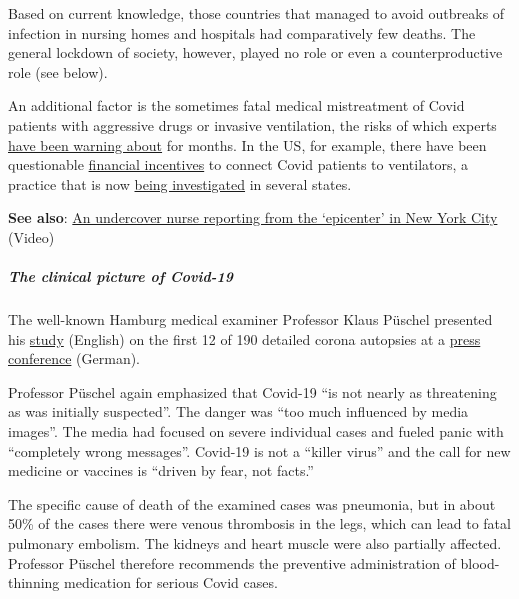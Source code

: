 Based on current knowledge, those countries that managed to avoid
outbreaks of infection in nursing homes and hospitals had comparatively
few deaths. The general lockdown of society, however, played no role or
even a counterproductive role (see below).

An additional factor is the sometimes fatal medical mistreatment of
Covid patients with aggressive drugs or invasive ventilation, the risks
of which experts
\href{https://off-guardian.org/2020/05/06/covid19-are-ventilators-killing-people/}{have
been warning about} for months. In the US, for example, there have been
questionable
\href{https://eu.usatoday.com/story/news/factcheck/2020/04/24/fact-check-medicare-hospitals-paid-more-covid-19-patients-coronavirus/3000638001/}{financial
incentives} to connect Covid patients to ventilators, a practice that is
now
\href{https://nypost.com/2020/05/29/northwell-health-probing-use-of-ventilators-for-covid-patients/}{being
investigated} in several states.

\textbf{See also}: \href{https://www.youtube.com/watch?v=UIDsKdeFOmQ}{An
undercover nurse reporting from the `epicenter' in New York City}
(Video)

\hypertarget{the-clinical-picture-of-covid-19-1}{%
\subparagraph{\texorpdfstring{\textbf{The clinical picture of
Covid-19}}{The clinical picture of Covid-19}}\label{the-clinical-picture-of-covid-19-1}}

The well-known Hamburg medical examiner Professor Klaus Püschel
presented his
\href{https://www.acpjournals.org/doi/10.7326/M20-2003}{study} (English)
on the first 12 of 190 detailed corona autopsies at a
\href{https://www.youtube.com/watch?v=GXhxorBBPYI}{press conference}
(German).

Professor Püschel again emphasized that Covid-19 ``is not nearly as
threatening as was initially suspected''. The danger was ``too much
influenced by media images''. The media had focused on severe individual
cases and fueled panic with ``completely wrong messages''. Covid-19 is
not a ``killer virus'' and the call for new medicine or vaccines is
``driven by fear, not facts.''

The specific cause of death of the examined cases was pneumonia, but in
about 50\% of the cases there were venous thrombosis in the legs, which
can lead to fatal pulmonary embolism. The kidneys and heart muscle were
also partially affected. Professor Püschel therefore recommends the
preventive administration of blood-thinning medication for serious Covid
cases.

